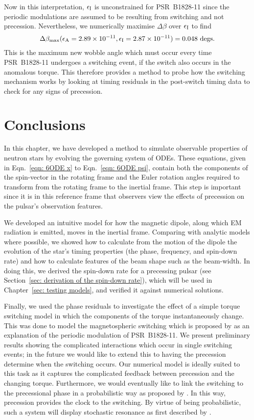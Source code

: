 \documentclass[../full_thesis/full_thesis.tex]{subfiles}
\begin{document}
Now in this interpretation, $\epsilon_{\mathrm{I}}$ is unconstrained for PSR~B1828-11 since the
periodic modulations are assumed to be resulting from switching and not
precession. Nevertheless, we numerically maximise $\Delta\beta$ over $\epsilon_{\mathrm{I}}$ to
find
\begin{align}
\Delta\beta_{\textrm{max}}(\epsilon_{\mathrm{A}}=2.89\times10^{-11}, \epsilon_{\mathrm{I}}=2.87\times10^{-11})
= 0.048 \textrm{ degs}.
\end{align}
This is the maximum new wobble angle which must occur every time PSR~B1828-11 undergoes a
switching event, if the switch also occurs in the anomalous torque. This
therefore provides a method to probe how the switching mechanism works by
looking at timing residuals in the post-switch timing data to check for
any signs of precession.

\section{Conclusions}
\label{sec: conclusion inertial}

In this chapter, we have developed a method to simulate observable properties
of neutron stars by evolving the governing system of ODEs. These equations,
given in Eqn.~\eqref{eqn: 6ODE x} to Eqn.~\eqref{eqn: 6ODE psi}, contain both
the components of the spin-vector in the rotating frame and the Euler rotation
angles required to transform from the rotating frame to the inertial frame.
This step is important since it is in this reference frame that observers view
the effects of precession on the pulsar's observation features.

We developed an intuitive model for how the magnetic dipole, along which EM
radiation is emitted, moves in the inertial frame. Comparing with analytic
models where possible, we showed how to calculate from the motion of the
dipole the evolution of the star's timing properties (the phase, frequency, and
spin-down rate) and how to calculate features of the beam shape such as the
beam-width. In doing this, we derived the spin-down rate for a precessing pulsar
(see Section~\ref{sec: derivation of the spin-down rate}), which will be used in
Chapter~\ref{sec: testing models}, and verified it against numerical solutions.

Finally, we used the phase residuals to investigate the effect of a simple
torque switching model in which the components of the torque instantaneously
change.  This was done to model the magnetospheric switching which is proposed
by \citet{Lyne2010} as an explanation of the periodic modulation of
PSR~B1828-11. We present preliminary results showing the complicated
interactions which occur in single switching events; in the future we would
like to extend this to having the precession determine when the switching
occurs. Our numerical model is ideally suited to this task as it captures the
complicated feedback between precession and the changing torque.  Furthermore,
we would eventually like to link the switching to the precessional phase in
a probabilistic way as proposed by \citet{Jones2012}. In this way, precession
provides the clock to the switching. By virtue of being probabilistic, such a
system will display stochastic resonance as first described by
\citet{Cordes2013}.

\biblio
\end{document}
